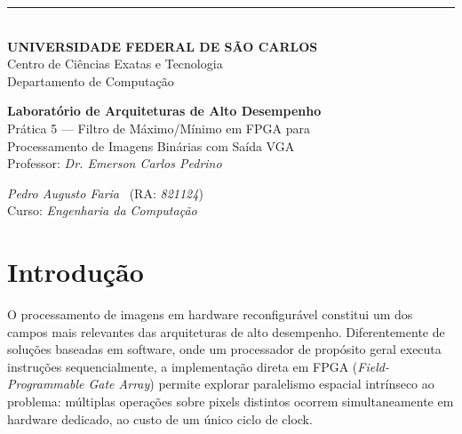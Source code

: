 \documentclass[12pt, a4paper]{article}
\begin{document}
	
	\thispagestyle{empty}
	
	\begin{titlepage}
		\centering
		
		\noindent\rule{\textwidth}{0.8pt}\\[0.2cm]
		{\large \textbf{UNIVERSIDADE FEDERAL DE SÃO CARLOS}}\\[0.15cm]
		{\normalsize Centro de Ciências Exatas e Tecnologia}\\[0.15cm]
		{\normalsize Departamento de Computação}\\[0.15cm]
		
		\vspace{0pt plus 0.35fill}
		
		{\large \textbf{Laboratório de Arquiteturas de Alto Desempenho}}\\[0.4cm]
		{\large Prática 5 --- Filtro de Máximo/Mínimo em FPGA para\\[0.2cm]
			Processamento de Imagens Binárias com Saída VGA}\\[1.0cm]
		{\normalsize Professor: \textit{Dr. Emerson Carlos Pedrino}}\\
		
		\vspace{0pt plus 0.65fill}
		
		\begin{center}
			{\normalsize \textit{Pedro Augusto Faria} \ (RA: \textit{821124})}\\[0.15cm]
			{\normalsize Curso: \textit{Engenharia da Computação}}\\[0.15cm]
		\end{center}
		
	\end{titlepage}
	
	\setcounter{page}{1}
	
	\section{Introdução}
	
	O processamento de imagens em hardware reconfigurável constitui um dos campos
	mais relevantes das arquiteturas de alto desempenho. Diferentemente de soluções
	baseadas em software, onde um processador de propósito geral executa instruções
	sequencialmente, a implementação direta em FPGA (\textit{Field-Programmable Gate
		Array}) permite explorar paralelismo espacial intrínseco ao problema: múltiplas
	operações sobre pixels distintos ocorrem simultaneamente em hardware dedicado,
	ao custo de um único ciclo de clock.
	
\end{document}
